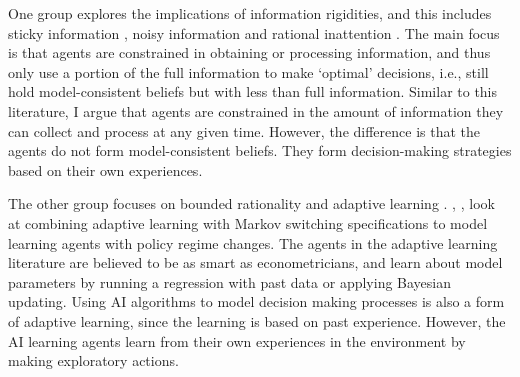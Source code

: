 \documentclass[hidelinks]{article}
\begin{document}
One group explores the implications of information rigidities, and this includes sticky information \citep{MankiwReis2002, Balletal2005}, noisy information \citep{Woodford2001} and rational inattention \citep{SIMS2003665}. The main focus is that agents are constrained in obtaining or processing information, and thus only use a portion of the full information to make `optimal' decisions, i.e., still hold model-consistent beliefs but with less than full information. Similar to this literature, I argue that agents are constrained in the amount of information they can collect and process at any given time. However, the difference is that the agents do not form model-consistent beliefs. They form decision-making strategies based on their own experiences.



The other group focuses on bounded rationality \citep{Sargent1993} and adaptive learning \citep{EvansHonkapohja1999}. \cite{Schorfheide2005}, \cite{OzdenWouter2021}, \cite{Airaudo2021} look at combining adaptive learning with Markov switching specifications to model learning agents with policy regime changes. The agents in the adaptive learning literature are believed to be as smart as econometricians, and learn about model parameters by running a regression with past data or applying Bayesian updating. Using AI algorithms to model decision making processes is also a form of adaptive learning, since the learning is based on past experience. However, the AI learning agents learn from their own experiences in the environment by making exploratory actions. 
 
 
\end{document}
